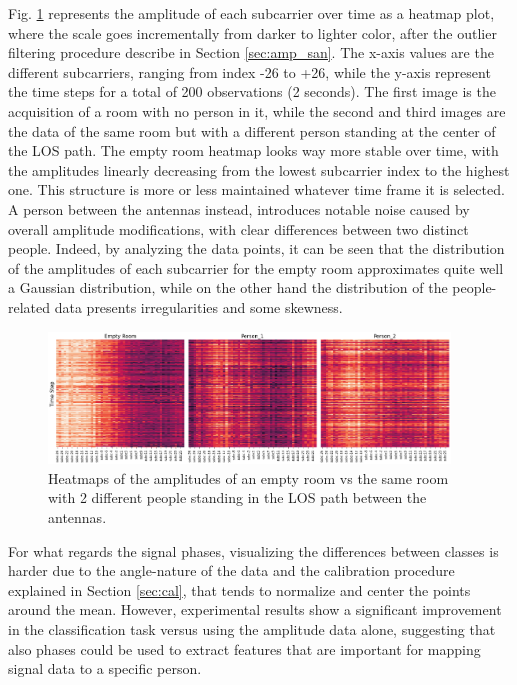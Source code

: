 \documentclass[binding=0.7cm, oneside]{sapthesis}
\begin{document}
Fig. \ref{fig:heatmap} represents the amplitude of each subcarrier over time as a heatmap plot, where the scale goes incrementally from darker to lighter color, after the outlier filtering procedure describe in Section \ref{sec:amp_san}. The x-axis values are the different subcarriers,
ranging from index -26 to +26, while the y-axis represent the time steps for a total of 200 observations (2 seconds). The first image is the acquisition of a room with no person in it, while the second and third
images are the data of the same room but with a different person standing at the center of the LOS path. The empty room heatmap looks way more stable over time, with the amplitudes linearly decreasing
from the lowest subcarrier index to the highest one. This structure is more or less maintained whatever time frame it is selected. A person between the antennas instead, introduces notable noise caused by overall amplitude modifications,
with clear differences between two distinct people. Indeed, by analyzing the data points, it can be seen that the distribution of the amplitudes of each subcarrier for the empty room approximates quite well a Gaussian distribution, while on the other hand the distribution of the people-related data presents
irregularities and some skewness.

\begin{figure}[h]
    \centering
    \includegraphics[width=0.95\textwidth]{images/heatmap_3.png}
    \caption{Heatmaps of the amplitudes of an empty room vs the same room with 2 different people standing in the LOS path between the antennas.}
    \label{fig:heatmap}
\end{figure}

For what regards the signal phases, visualizing the differences between classes is harder due to the angle-nature of the data and the calibration procedure explained in Section \ref{sec:cal}, that tends to normalize and center the points around the mean.
However, experimental results show a significant improvement in the classification task versus using the amplitude data alone, suggesting that also phases could be used to extract features that are important for mapping signal data to a specific person.


\end{document}
